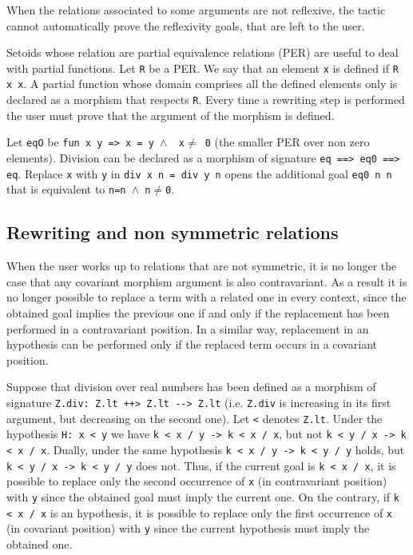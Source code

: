 When the relations associated to some arguments are not reflexive, the tactic
cannot automatically prove the reflexivity goals, that are left to the user.

Setoids whose relation are partial equivalence relations (PER)
are useful to deal with partial functions. Let \texttt{R} be a PER. We say
that an element \texttt{x} is defined if \texttt{R x x}. A partial function
whose domain comprises all the defined elements only is declared as a
morphism that respects \texttt{R}. Every time a rewriting step is performed
the user must prove that the argument of the morphism is defined.

\begin{cscexample}
Let \texttt{eqO} be \texttt{fun x y => x = y $\land$ ~x$\neq$ 0} (the smaller PER over
non zero elements). Division can be declared as a morphism of signature
\texttt{eq ==> eq0 ==> eq}. Replace \texttt{x} with \texttt{y} in
\texttt{div x n = div y n} opens the additional goal \texttt{eq0 n n} that
is equivalent to \texttt{n=n $\land$ n$\neq$0}.
\end{cscexample}

\subsection{Rewriting and non symmetric relations}
When the user works up to relations that are not symmetric, it is no longer
the case that any covariant morphism argument is also contravariant. As a
result it is no longer possible to replace a term with a related one in
every context, since the obtained goal implies the previous one if and
only if the replacement has been performed in a contravariant position.
In a similar way, replacement in an hypothesis can be performed only if
the replaced term occurs in a covariant position.

\begin{cscexample}
Suppose that division over real numbers has been defined as a
morphism of signature \texttt{Z.div: Z.lt ++> Z.lt -{}-> Z.lt} (i.e.
\texttt{Z.div} is increasing in its first argument, but decreasing on the
second one). Let \texttt{<} denotes \texttt{Z.lt}.
Under the hypothesis \texttt{H: x < y} we have
\texttt{k < x / y -> k < x / x}, but not
\texttt{k < y / x -> k < x / x}.
Dually, under the same hypothesis \texttt{k < x / y -> k < y / y} holds,
but \texttt{k < y / x -> k < y / y} does not.
Thus, if the current goal is \texttt{k < x / x}, it is possible to replace
only the second occurrence of \texttt{x} (in contravariant position)
with \texttt{y} since the obtained goal must imply the current one.
On the contrary, if \texttt{k < x / x} is
an hypothesis, it is possible to replace only the first occurrence of
\texttt{x} (in covariant position) with \texttt{y} since
the current hypothesis must imply the obtained one.
\end{cscexample}

